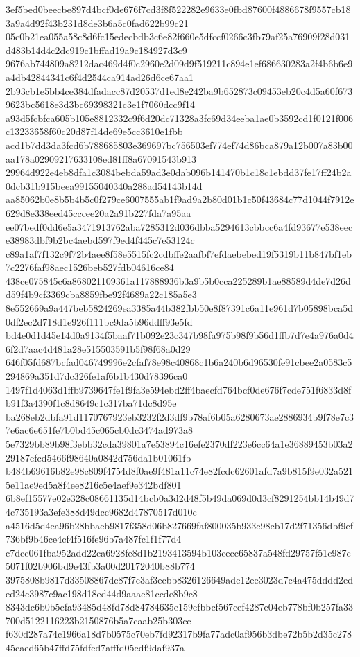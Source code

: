 \documentclass[11pt,a4paper]{article}
\begin{document}
{3ef5bed0beecbe897d4bcf0de676f7cd3f8f522282e9633e0fbd87600f4886678f9557cb183a9a4d92f43b231d8de3b6a5c0fad622b99c21
05c0b21ea055a58c8d6fc15edecbdb3c6e82f660e5dfccf0266c3fb79af25a76909f28d031d483b14d4c2dc919c1bffad19a9c184927d3c9
9676ab744809a8212dac469d4f0c2960e2d09d9f519211c894e1ef686630283a2f4b6b6e9a4db42844341c6f4d2544ca914ad26d6ce67aa1
2b93cb1e5bb4ce384dfadacc87d20537d1ed8e242ba9b652873c09453eb20c4d5a60f6739623bc5618e3d3bc69398321c3e1f7060dcc9f14
a93d5fcbfca605b105e8812332c9f6d20dc71328a3fc69d34eeba1ae0b3592cd1f0121f006c13233658f60c20d87f14de69e5cc3610e1fbb
acd1b7dd3da3fcd6b788685803e369697bc756503ef774ef74d86bca879a12b007a83b00aa178a02909217633108ed81ff8a67091543b913
29964d922e4eb8dfa1c3084bebda59ad3e0dab096b141470b1c18c1ebdd37fe17ff24b2a0dcb31b915beea99155040340a288ad54143b14d
aa85062b0e8b5b4b5c0f279ce6007555ab1f9ad9a2b80d01b1c50f43684c77d1044f7912e629d8e338eed45cccee20a2a91b227fda7a95aa
ee07bedf0dd6e5a3471913762aba7285312d036dbba5294613cbbcc6a4fd93677e538eece38983dbf9b2bc4aebd597f9ed4f445c7e53124c
c89a1af7f132c9f72b4aee8f58e5515fc2cdbffe2aafbf7efdaebebed19f5319b11b847bf1eb7c2276faf98aec1526beb527fdb04616ce84
438ce075845c6a868021109361a117888936b3a9b5b0cca225289b1ae88589d4de7d26dd59f4b9cf3369cba8859fbe92f4689a22c185a5e3
8e552669a9a447beb5824269ea3385a44b382fbb50e8f87391c6a11e961d7b05898bca5d0df2ec2d718d1e926f111bc9da5b96ddff93e5fd
bd4e0d1d45e14d0a9134f5baaf71b092e23c347b98fa975b98f9b56d1ffb7d7e4a976a0d46f2d7aac4d481a28e515503591b5f98f68a0d29
646f05fd687bcfad046749996e2cfaf78e98c40868c1b6a240b6d96530fe91cbee2a0583c5294869a351d7dc326fe1af6b1b430d78396ca0
1497f1d4063d1ffb9739647fe1f9fa3e594ebd2ff4baecfd764bcf0de676f7cde751f6833d8fb91f3a4390f1c8d8649c1c317ba71dc8d95e
ba268eb2dbfa91d1170767923eb3232f2d3df9b78af6b05a6280673ae2886934b9f78e7c37e6ac6e651fe7b0bd45c065cb0dc3474ad973a8
5e7329bb89b98f3ebb32cda39801a7e53894c16efe2370df223e6cc64a1e36889453b03a229187efcd5466f98640a0842d756da1b01061fb
b484b69616b82e98c809f4754d8f0ae9f481a11c74e82fcdc62601afd7a9b815f9e032a5215e11ae9ed5a8f4ee8216c5e4aef9e342bdf801
6b8ef15577e02e328c08661135d14bcb0a3d2d48f5b49da069d0d3cf8291254bb14b49d74c735193a3efe388d49dcc9682d47870517d010c
a4516d5d4ea96b28bbaeb9817f358d06b827669faf800035b933c98cb17d2f71356dbf9ef736bf9b46ce4cf4f516fe96b7a487fc1f1f77d4
c7dcc061fba952add22ca6928fe8d1b2193413594b103cecc65837a548fd29757f51c987c5071f02b906bd9e43fb3a00d20172040b88b774
3975808b9817d33508867dc87f7c3af3ecbb8326126649ade12ee3023d7c4a475dddd2eded24c3987c9ac198d18ed44d9aaae81ccde8b9c8
8343dc6b0b5cfa93485d48fd78d84784635e159efbbcf567cef4287e04eb778bf0b257fa33700d5122116223b2150876b5a7caab25b303cc
f630d287a74c1966a18d7b0575c70eb7fd92317b9fa77adc0af956b3dbe72b5b2d35c27845caed65b47ffd75fdfed7afffd05edf9daf937a
}
\end{document}
